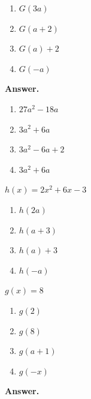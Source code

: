 \documentclass[10pt,]{book}
\theoremstyle{plain}
\theoremstyle{definition}
\theoremstyle{definition}
\theoremstyle{definition}
\begin{document}
\begin{exerciselist}
\begin{exercisegroup}
\begin{multicols}{2}
\begin{enumerate}[label=\alph*]
\item\hypertarget{li-244}{}\(G(3a)\)%
\item\hypertarget{li-245}{}\(G(a + 2)\)%
\item\hypertarget{li-246}{}\(G(a) + 2\)%
\item\hypertarget{li-247}{}\(G(-a)\)%
\end{enumerate}
\end{multicols}
%
\par\smallskip
\noindent\textbf{Answer.}\hypertarget{answer-40}{}\quad
\leavevmode%
\begin{multicols}{2}
\begin{enumerate}[label=\alph*]
\item\hypertarget{li-248}{}\(27a^2 - 18a\)%
\item\hypertarget{li-249}{}\(3a^2 + 6a\)%
\item\hypertarget{li-250}{}\(3a^2 - 6a + 2\)%
\item\hypertarget{li-251}{}\(3a^2 + 6a \)%
\end{enumerate}
\end{multicols}
%
\exercise[60.]\hypertarget{exercise-70}{}\(h(x) = 2x^2 + 6x - 3\) \leavevmode%
\begin{multicols}{2}
\begin{enumerate}[label=\alph*]
\item\hypertarget{li-252}{}\(h(2a)\)%
\item\hypertarget{li-253}{}\(h(a + 3)\)%
\item\hypertarget{li-254}{}\(h(a) + 3\)%
\item\hypertarget{li-255}{}\(h(-a)\)%
\end{enumerate}
\end{multicols}
%
\exercise[61.]\hypertarget{exercise-71}{}\(g(x) = 8\) \leavevmode%
\begin{multicols}{2}
\begin{enumerate}[label=\alph*]
\item\hypertarget{li-256}{}\(g(2)\)%
\item\hypertarget{li-257}{}\(g(8)\)%
\item\hypertarget{li-258}{}\(g(a + 1)\)%
\item\hypertarget{li-259}{}\(g(-x)\)%
\end{enumerate}
\end{multicols}
%
\par\smallskip
\noindent\textbf{Answer.}\hypertarget{answer-41}{}\quad
\leavevmode%
\begin{multicols}{2}
\begin{enumerate}[label=\alph*]

\end{enumerate}
\end{multicols}
\end{exercisegroup}
\end{exerciselist}
\end{document}
